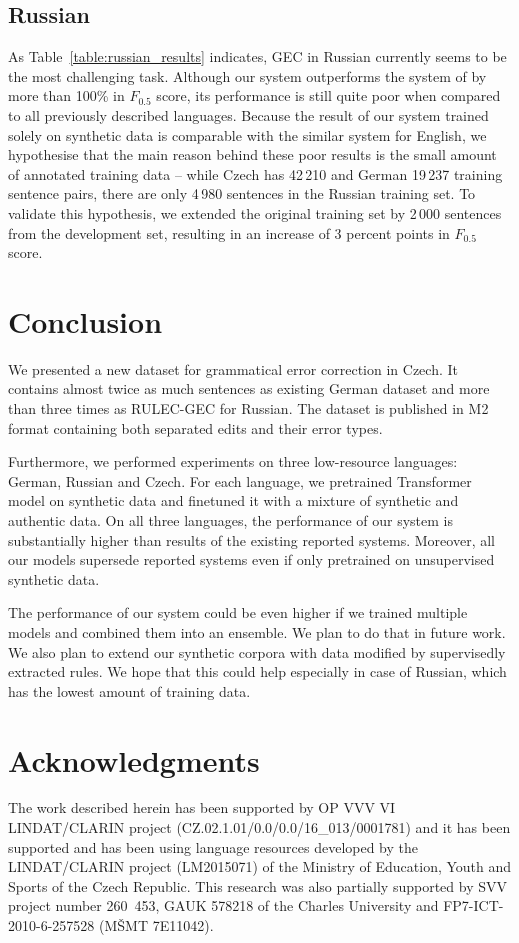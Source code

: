 \documentclass[11pt,a4paper]{article}
\begin{document}
\subsection{Russian}

As Table~\ref{table:russian_results} indicates, GEC in Russian currently seems to be the most challenging task. Although our system outperforms the system of  by more than 100\% in $F_{0.5}$ score, its performance is still quite poor when compared to all previously described languages. Because the result of our system trained solely on synthetic data is comparable with the similar system for English, we hypothesise that the main reason behind these poor results is the small amount of annotated training data -- while Czech has 42\,210 and German 19\,237 training sentence pairs, there are only 4\,980 sentences in the Russian training set. To validate this hypothesis, we extended the original training set by 2\,000 sentences from the development set, resulting in an increase of 3 percent points in $F_{0.5}$ score.

\section{Conclusion}

We presented a new dataset for grammatical error correction in Czech. It contains almost twice as much sentences as existing German dataset and more than three times as RULEC-GEC for Russian. The dataset is published in M2 format containing both separated edits and their error types.

Furthermore, we performed experiments on three low-resource languages: German, Russian and Czech. For each language, we pretrained Transformer model on synthetic data and finetuned it with a mixture of synthetic and authentic data. On all three languages, the performance of our system is substantially higher than results of the existing reported systems. Moreover, all our models supersede reported systems even if only pretrained on unsupervised synthetic data.

The performance of our system could be even higher if we trained multiple models and combined them into an ensemble. We plan to do that in future work. We also plan to extend our synthetic corpora with data modified by supervisedly extracted rules. We hope that this could help especially in case of Russian, which has the lowest amount of training data.

\section*{Acknowledgments}

The work described herein has been supported by OP VVV VI LINDAT/CLARIN project (CZ.02.1.01/0.0/0.0/16\_013/0001781) and it has been supported and has been using language resources developed by the LINDAT/CLARIN project (LM2015071) of the Ministry of Education, Youth and Sports of the Czech Republic. This research was also partially supported by SVV project number 260~453, GAUK 578218 of the Charles University and FP7-ICT-2010-6-257528 (MŠMT 7E11042).





\end{document}
